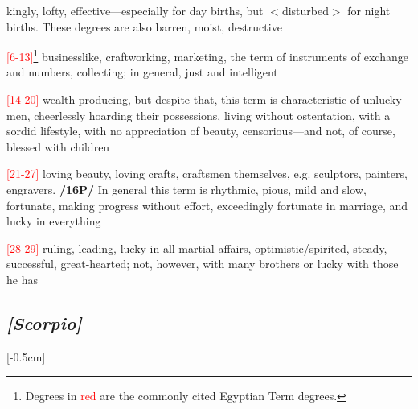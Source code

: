 \begin{description}[labelindent=0em , labelwidth=1em, labelsep=1em, leftmargin =!]
\item[\Saturn]
	[0-5] kingly, lofty, effective—especially for day births, but $<$disturbed$>$ for night births. These degrees are also barren, moist, destructive
\item[\Mercury]
	[6-10]\textcolor{red}{[6-13]\footnote{Degrees in \textcolor{red}{red} are the commonly cited Egyptian Term degrees.}} businesslike, craftworking, marketing, the term of instruments of exchange and numbers, collecting; in general, just and intelligent	
\item[\Jupiter]
	[11-18]\textcolor{red}{[14-20]} wealth-producing, but
despite that, this term is characteristic of unlucky men, cheerlessly hoarding their possessions, living without ostentation, with a sordid lifestyle, with no appreciation of beauty, censorious—and not, of course, blessed with children	
\item[\Venus]
	[19-25]\textcolor{red}{[21-27]} loving beauty, loving crafts, craftsmen
themselves, e.g. sculptors, painters, engravers. \textbf{/16P/} In general this term is rhythmic, pious, mild and slow, fortunate, making progress without effort, exceedingly fortunate in marriage, and lucky in everything
\item[\Mars]
	[26-29]\textcolor{red}{[28-29]} ruling, leading, lucky in all martial affairs, optimistic/spirited, steady, successful, great-hearted; not, however, with many brothers or lucky with those he has
\end{description}

\subsection{\textit{[Scorpio]}}
\marginnote{\Scorpio}[-0.5cm]
\vspace{-1mm}

